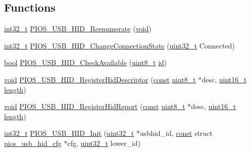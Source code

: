 \subsection*{Functions}
\begin{DoxyCompactItemize}
\item 
\hyperlink{group___n_a_m_e_gafd12020da5a235dfcf0c3c748fb5baed}{int32\-\_\-t} \hyperlink{group___p_i_o_s___u_s_b___h_i_d_ga4f30a843d1680813d9ae2784e63ba6ff}{P\-I\-O\-S\-\_\-\-U\-S\-B\-\_\-\-H\-I\-D\-\_\-\-Reenumerate} (\hyperlink{group___n_a_m_e_ga18028b8badbf1ea7e704ccac3c488e82}{void})
\item 
\hyperlink{group___n_a_m_e_gafd12020da5a235dfcf0c3c748fb5baed}{int32\-\_\-t} \hyperlink{group___p_i_o_s___u_s_b___h_i_d_ga7bc7de75840613b8ba148d493d12598b}{P\-I\-O\-S\-\_\-\-U\-S\-B\-\_\-\-H\-I\-D\-\_\-\-Change\-Connection\-State} (\hyperlink{stdint_8h_a435d1572bf3f880d55459d9805097f62}{uint32\-\_\-t} Connected)
\item 
\hyperlink{group___exported__types_gaf6a258d8f3ee5206d682d799316314b1}{bool} \hyperlink{group___p_i_o_s___u_s_b___h_i_d_ga2d215927e0302a88603e843e9975277e}{P\-I\-O\-S\-\_\-\-U\-S\-B\-\_\-\-H\-I\-D\-\_\-\-Check\-Available} (\hyperlink{stdint_8h_aba7bc1797add20fe3efdf37ced1182c5}{uint8\-\_\-t} \hyperlink{group___u_a_v_gabaabdc509cdaba7df9f56c6c76f3ae19}{id})
\item 
\hyperlink{group___n_a_m_e_ga18028b8badbf1ea7e704ccac3c488e82}{void} \hyperlink{group___p_i_o_s___u_s_b___h_i_d_gab90f1c47b587196a2db9f82b0893c12b}{P\-I\-O\-S\-\_\-\-U\-S\-B\-\_\-\-H\-I\-D\-\_\-\-Register\-Hid\-Descriptor} (\hyperlink{group___n_a_m_e_ga7ae6d0e43244213b34de2c2b9aa30da6}{const} \hyperlink{stdint_8h_aba7bc1797add20fe3efdf37ced1182c5}{uint8\-\_\-t} $\ast$desc, \hyperlink{stdint_8h_a273cf69d639a59973b6019625df33e30}{uint16\-\_\-t} \hyperlink{mavlink__helpers_8h_a4254bfa282bd215965d99b8d6b527a04}{length})
\item 
\hyperlink{group___n_a_m_e_ga18028b8badbf1ea7e704ccac3c488e82}{void} \hyperlink{group___p_i_o_s___u_s_b___h_i_d_ga24ffa70cf0e157835a2e6ea2dfb7f916}{P\-I\-O\-S\-\_\-\-U\-S\-B\-\_\-\-H\-I\-D\-\_\-\-Register\-Hid\-Report} (\hyperlink{group___n_a_m_e_ga7ae6d0e43244213b34de2c2b9aa30da6}{const} \hyperlink{stdint_8h_aba7bc1797add20fe3efdf37ced1182c5}{uint8\-\_\-t} $\ast$desc, \hyperlink{stdint_8h_a273cf69d639a59973b6019625df33e30}{uint16\-\_\-t} \hyperlink{mavlink__helpers_8h_a4254bfa282bd215965d99b8d6b527a04}{length})
\item 
\hyperlink{group___n_a_m_e_gafd12020da5a235dfcf0c3c748fb5baed}{int32\-\_\-t} \hyperlink{group___p_i_o_s___u_s_b___h_i_d_ga4ea302beb0afbb7a83ff9ff1b20eb9cc}{P\-I\-O\-S\-\_\-\-U\-S\-B\-\_\-\-H\-I\-D\-\_\-\-Init} (\hyperlink{stdint_8h_a435d1572bf3f880d55459d9805097f62}{uint32\-\_\-t} $\ast$usbhid\-\_\-id, \hyperlink{group___n_a_m_e_ga7ae6d0e43244213b34de2c2b9aa30da6}{const} struct \hyperlink{structpios__usb__hid__cfg}{pios\-\_\-usb\-\_\-hid\-\_\-cfg} $\ast$cfg, \hyperlink{stdint_8h_a435d1572bf3f880d55459d9805097f62}{uint32\-\_\-t} lower\-\_\-id)

\end{DoxyCompactItemize}
